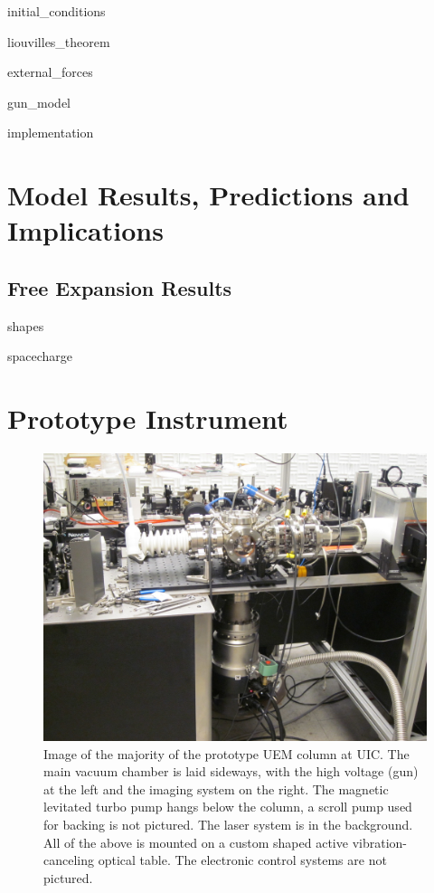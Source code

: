 \documentclass{uicthesi}
\begin{document}
  {initial_conditions}

  {liouvilles_theorem}


  {external_forces}

  {gun_model}

  {implementation}

\chapter{Model Results, Predictions and Implications}

\section{Free Expansion Results}

  {shapes}

  {spacecharge}

\chapter{Prototype Instrument}

  \begin{figure}
    \centering
    \includegraphics{inc/hardware/column.jpg}
    \caption{
      Image of the majority of the prototype UEM column at UIC.
      The main vacuum chamber is laid sideways, with the high voltage (gun) at the left and the imaging system on the right.
      The magnetic levitated turbo pump hangs below the column, a scroll pump used for backing is not pictured.
      The laser system is in the background.
      All of the above is mounted on a custom shaped active vibration-canceling optical table.
      The electronic control systems are not pictured.
    }
    \label{fig:column-pic}
  \end{figure}
\end{document}

